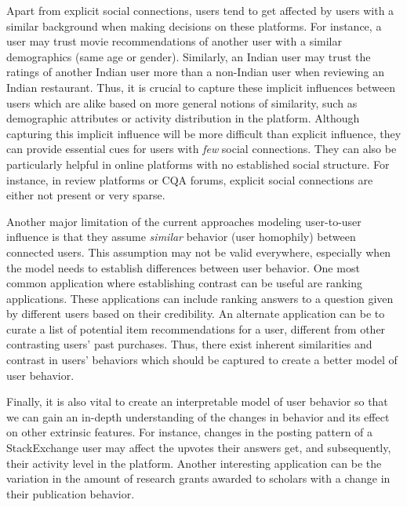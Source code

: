 Apart from explicit social connections, users tend to get affected by users with a similar background when making decisions on these platforms. For instance, a user may trust movie recommendations of another user with a similar demographics (same age or gender). Similarly, an Indian user may trust the ratings of another Indian user more than a non-Indian user when reviewing an Indian restaurant. Thus, it is crucial to capture these implicit influences %
between users which are alike based on more general notions of similarity, such as demographic attributes or activity distribution in the platform. %
Although capturing this implicit influence will be more difficult than explicit influence, they can provide essential cues for users with \emph{few} social connections. They can also be particularly helpful in online platforms with no established social structure. For instance, in review platforms or CQA forums, explicit social connections are either not present or very sparse.

Another major limitation of the current approaches modeling user-to-user influence is that they assume \emph{similar} behavior (user homophily) between connected users. This assumption may not be valid everywhere, especially when the model needs to establish differences between user behavior. One most common application where establishing contrast can be useful are ranking applications. These applications can include ranking answers to a question given by different users based on their credibility. An alternate application can be to curate a list of potential item recommendations for a user, different from other contrasting users' past purchases. Thus, there exist inherent similarities and contrast in users' behaviors which should be captured to create a better model of user behavior.


Finally, it is also vital to create an interpretable model of user behavior so that we can gain an in-depth understanding of the changes in behavior and its effect on other extrinsic features. For instance, changes in the posting pattern of a StackExchange user may affect the upvotes their answers get, and subsequently, their activity level in the platform. Another interesting application can be the variation in the amount of research grants awarded to scholars with a change in their publication behavior.


